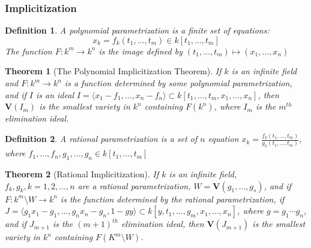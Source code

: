 \documentclass{article}
\theoremstyle{mystyle}
\newtheorem{theorem}{Theorem}[section]
\newtheorem{definition}{Definition}[section]
\begin{document}
\subsubsection{Implicitization}
\begin{definition}
A polynomial parametrization is a finite set of equations:
\begin{equation*}
    x_k = f_k(t_1,\hdots, t_m)\in k[t_1,\hdots, t_m]    
\end{equation*}
The function $F:k^m\rightarrow k^n$ is the image defined by $(t_1,\hdots, t_m)\mapsto (x_1,\hdots, x_n)$
\end{definition}
\begin{theorem}[The Polynomial Implicitization Theorem]
If $k$ is an infinite field and $F:k^m\rightarrow k^n$ is a function determined by some polynomial parametrization, and if $I$ is an ideal $I = \langle x_1-f_1,\hdots, x_n - f_n\rangle \subset k[t_1,\hdots, t_m, x_1,\hdots, x_n]$, then $\textbf{V}(I_m)$ is the smallest variety in $k^n$ containing $F(k^n)$, where $I_m$ is the $m^{th}$ elimination ideal.
\end{theorem}
\begin{definition}
A rational parametrization is a set of $n$ equation $x_k = \frac{f_k(t_1,\hdots, t_m)}{g_k(t_1,\hdots, t_m)}$, where $f_1,\hdots, f_n, g_1,\hdots, g_n\in k[t_1,\hdots, t_m]$
\end{definition}
\begin{theorem}[Rational Implicitization]
If $k$ is an infinite field, $f_k, g_k, k=1,2,\hdots, n$ are a rational parametrization, $W = \mathbf{V}(g_1,\hdots, g_s)$, and if $F:k^m\setminus W \rightarrow k^n$ is the function determined by the rational parametrization, if $J = \langle g_1 x_1 - g_1,\hdots, g_n x_n - g_n, 1-gy\rangle \subset k[y,t_1,\hdots, g_m, x_1,\hdots, x_n]$, where $g = g_1\cdots g_n$, and if $J_{m+1}$ is the $(m+1)^{th}$ elimination ideal, then $\textbf{V}(J_{m+1})$ is the smallest variety in $k^n$ containing $F(K^m\setminus W)$.
\end{theorem}
\end{document}
